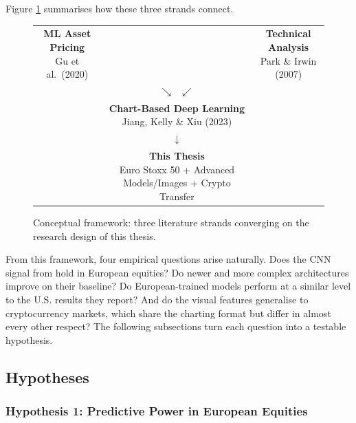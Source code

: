 Figure \ref{fig:conceptual_framework} summarises how these three strands connect.

\begin{figure}[H]
  \centering
  \renewcommand{\arraystretch}{1.4}
  \begin{tabular}{ccc}
    \fbox{\parbox{3.8cm}{\centering \textbf{ML Asset Pricing}\\[2pt]
          {\small Gu et al.\ (2020)}}}
    & \hspace{1.5cm} &
    \fbox{\parbox{3.8cm}{\centering \textbf{Technical Analysis}\\[2pt]
          {\small Park \& Irwin (2007)}}} \\[6pt]
    & $\searrow \hspace{0.4cm} \swarrow$ & \\[-4pt]
    &
    \fbox{\parbox{4.2cm}{\centering \textbf{Chart-Based Deep Learning}\\[2pt]
          {\small Jiang, Kelly \& Xiu (2023)}}}
    & \\[6pt]
    & $\downarrow$ & \\[-4pt]
    &
    \fbox{\parbox{4.2cm}{\centering \textbf{This Thesis}\\[2pt]
          {\small Euro Stoxx 50 + Advanced Models/Images + Crypto Transfer}}}
    & \\
  \end{tabular}
  \caption{Conceptual framework: three literature strands converging on the research design of this thesis.}
  \label{fig:conceptual_framework}
\end{figure}

From this framework, four empirical questions arise naturally. Does the CNN signal from \textcite{Jiang2023} hold in European equities? Do newer and more complex architectures improve on their baseline? Do European-trained models perform at a similar level to the U.S. results they report? And do the visual features generalise to cryptocurrency markets, which share the charting format but differ in almost every other respect? The following subsections turn each question into a testable hypothesis.

\subsection{Hypotheses}

\subsubsection*{Hypothesis 1: Predictive Power in European Equities}

